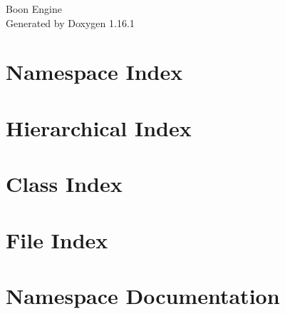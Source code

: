 \documentclass[twoside]{book}
\newcommand{\+}{\discretionary{\mbox{\scriptsize$\hookleftarrow$}}{}{}}
\newcommand{\clearemptydoublepage}{%
    \newpage{\pagestyle{empty}\cleardoublepage}%
  }
\begin{document}
  \raggedbottom
    \hypersetup{pageanchor=false,
                bookmarksnumbered=true,
                pdfencoding=unicode
               }
  \begin{titlepage}
  \vspace*{7cm}
  \begin{center}%
  {\Large Boon Engine}\\
  \vspace*{1cm}
  {\large Generated by Doxygen 1.16.1}\\
  \end{center}
  \end{titlepage}
  \clearemptydoublepage
  \tableofcontents
  \clearemptydoublepage
  \hypersetup{pageanchor=true}
\chapter{Namespace Index}

\chapter{Hierarchical Index}

\chapter{Class Index}

\chapter{File Index}

\chapter{Namespace Documentation}

\end{document}
